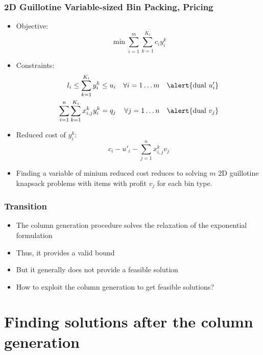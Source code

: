 \documentclass[10pt]{beamer}
\begin{document}
\begin{frame}
  \frametitle{2D Guillotine Variable-sized Bin Packing, Pricing}
  
  \begin{itemize}
    \item Objective:
      \begin{displaymath}
        \min \sum_{i = 1}^m \sum_{k = 1}^{K_i} c_i y_i^k
      \end{displaymath}

    \item Constraints:
      \begin{align*}
        l_i \le \sum_{k = 1}^{K_i} y_i^k \le u_i && \forall i = 1 \dots m && \alert{\text{dual } u'_i} \\
        \sum_{i = 1}^n \sum_{k = 1}^{K_i} x_{i, j}^k y_i^k = q_j && \forall j = 1 \dots n && \alert{\text{dual } v_j} \\
      \end{align*}

    \item \pause Reduced cost of $y_i^k$:
      \begin{displaymath}
        c_i - u'_i - \sum_{j = 1}^n x_{i, j}^k v_j
      \end{displaymath}

    \item \pause Finding a variable of minium reduced cost reduces to solving $m$ 2D guillotine knapsack problems with items with profit $v_j$ for each bin type.
  \end{itemize}
\end{frame}

\begin{frame}
  \frametitle{Transition}

  \begin{itemize}
    \item The column generation procedure solves the relaxation of the exponential formulation
    \item \pause Thus, it provides a valid bound
    \item \pause But it generally does not provide a feasible solution
    \item \pause How to exploit the column generation to get feasible solutions?
  \end{itemize}
\end{frame}

\section{Finding solutions after the column generation}
\end{document}
